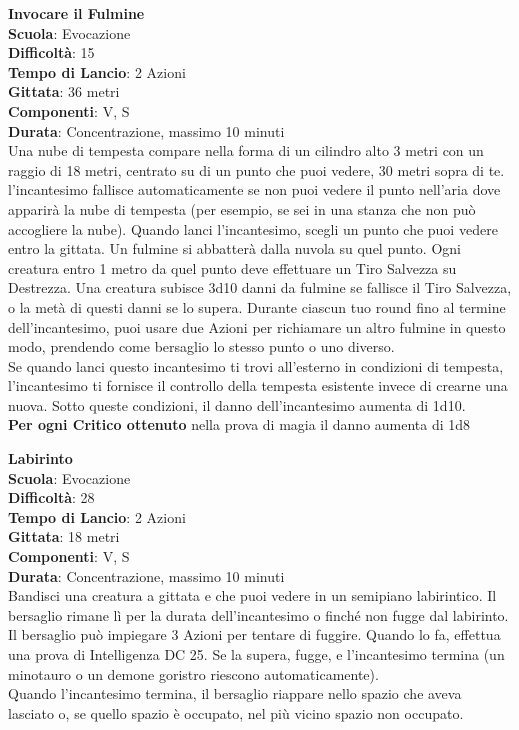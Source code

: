\begin{multicols}{2}
\medskip\textbf{Invocare il Fulmine}\\
\textbf{Scuola}: Evocazione\\
\textbf{Difficoltà}:  15\\
\textbf{Tempo di Lancio}: 2 Azioni\\
\textbf{Gittata}: 36 metri\\
\textbf{Componenti}: V, S\\
\textbf{Durata}: Concentrazione, massimo 10 minuti\\
Una nube di tempesta compare nella forma di un cilindro alto 3 metri con un raggio di 18 metri, centrato su di un punto che puoi vedere, 30 metri sopra di te. l'incantesimo fallisce automaticamente se non puoi vedere il punto nell'aria dove apparirà la nube di tempesta (per esempio, se sei in una stanza che non può accogliere la nube). Quando lanci l'incantesimo, scegli un punto che puoi vedere entro la gittata. Un fulmine si abbatterà dalla nuvola su quel punto. Ogni creatura entro 1 metro da  quel punto deve effettuare un Tiro Salvezza su Destrezza. Una creatura  subisce 3d10 danni da fulmine se fallisce il Tiro Salvezza, o la metà di questi danni se lo supera. Durante ciascun tuo round fino al termine dell'incantesimo, puoi usare due Azioni per richiamare un altro fulmine in questo modo, prendendo come bersaglio lo stesso punto o uno diverso.\\
Se quando lanci questo incantesimo ti trovi all'esterno in condizioni di tempesta, l'incantesimo ti fornisce il controllo della tempesta esistente invece di crearne una nuova. Sotto queste condizioni, il danno dell'incantesimo aumenta di 1d10. \\
\textbf{Per ogni Critico ottenuto} nella prova di magia il danno aumenta di 1d8

\medskip\textbf{Labirinto}\\
\textbf{Scuola}: Evocazione\\
\textbf{Difficoltà}:  28\\
\textbf{Tempo di Lancio}: 2 Azioni\\
\textbf{Gittata}: 18 metri\\
\textbf{Componenti}: V, S\\
\textbf{Durata}: Concentrazione, massimo 10 minuti\\
Bandisci una creatura a gittata e che puoi vedere in un semipiano labirintico. Il bersaglio rimane lì per la durata dell'incantesimo o finché non fugge dal labirinto. Il bersaglio può impiegare 3 Azioni per tentare di fuggire. Quando lo fa, effettua una prova di Intelligenza DC 25. Se la supera, fugge, e l'incantesimo termina (un minotauro o un demone goristro riescono automaticamente).\\
Quando l'incantesimo termina, il bersaglio riappare nello spazio che aveva lasciato o, se quello spazio è occupato, nel più vicino spazio non occupato. 


\end{multicols}
